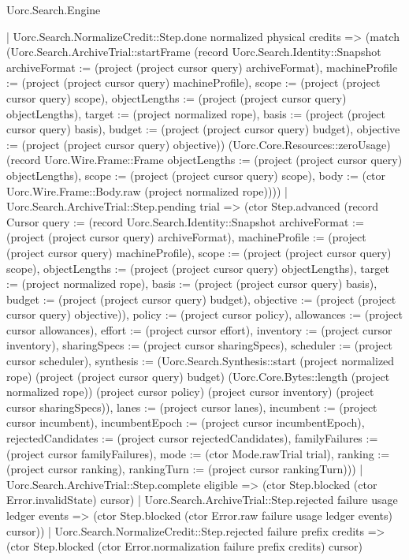 \begin{lexlean}{Uorc.Search.Engine}
\begin{semanticmodule}
{          | Uorc.Search.NormalizeCredit::Step.done normalized physical credits => (match (Uorc.Search.ArchiveTrial::startFrame (record Uorc.Search.Identity::Snapshot {archiveFormat := (project (project cursor query) archiveFormat), machineProfile := (project (project cursor query) machineProfile), scope := (project (project cursor query) scope), objectLengths := (project (project cursor query) objectLengths), target := (project normalized rope), basis := (project (project cursor query) basis), budget := (project (project cursor query) budget), objective := (project (project cursor query) objective)}) (Uorc.Core.Resources::zeroUsage) (record Uorc.Wire.Frame::Frame {objectLengths := (project (project cursor query) objectLengths), scope := (project (project cursor query) scope), body := (ctor Uorc.Wire.Frame::Body.raw (project normalized rope))}))
            | Uorc.Search.ArchiveTrial::Step.pending trial => (ctor Step.advanced (record Cursor {query := (record Uorc.Search.Identity::Snapshot {archiveFormat := (project (project cursor query) archiveFormat), machineProfile := (project (project cursor query) machineProfile), scope := (project (project cursor query) scope), objectLengths := (project (project cursor query) objectLengths), target := (project normalized rope), basis := (project (project cursor query) basis), budget := (project (project cursor query) budget), objective := (project (project cursor query) objective)}), policy := (project cursor policy), allowances := (project cursor allowances), effort := (project cursor effort), inventory := (project cursor inventory), sharingSpecs := (project cursor sharingSpecs), scheduler := (project cursor scheduler), synthesis := (Uorc.Search.Synthesis::start (project normalized rope) (project (project cursor query) budget) (Uorc.Core.Bytes::length (project normalized rope)) (project cursor policy) (project cursor inventory) (project cursor sharingSpecs)), lanes := (project cursor lanes), incumbent := (project cursor incumbent), incumbentEpoch := (project cursor incumbentEpoch), rejectedCandidates := (project cursor rejectedCandidates), familyFailures := (project cursor familyFailures), mode := (ctor Mode.rawTrial trial), ranking := (project cursor ranking), rankingTurn := (project cursor rankingTurn)}))
            | Uorc.Search.ArchiveTrial::Step.complete eligible => (ctor Step.blocked (ctor Error.invalidState) cursor)
            | Uorc.Search.ArchiveTrial::Step.rejected failure usage ledger events => (ctor Step.blocked (ctor Error.raw failure usage ledger events) cursor))
          | Uorc.Search.NormalizeCredit::Step.rejected failure prefix credits => (ctor Step.blocked (ctor Error.normalization failure prefix credits) cursor)
}
\end{semanticmodule}
\end{lexlean}
